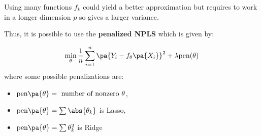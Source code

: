 Using many functions $f_k$ could yield a better approximation but requires to work in a longer dimension $p$ so gives a larger variance.

Thus, it is possible to use the \textbf{penalized NPLS} which is given by:

\begin{equation}
\min_{\theta} \frac{1}{n}\sum_{i=1}^{n}\pa{Y_i-f_\theta\pa{X_i}}^2+\lambda\mathrm{pen}(\theta)
\end{equation}
where some possible penalizations are:
\begin{itemize}
  \item $\mathrm{pen}\pa{\theta} = \text{ number of nonzero }\theta $,
  \item $\mathrm{pen}\pa{\theta} = \sum \abs{\theta_k}$ is Lasso,
  \item $\mathrm{pen}\pa{\theta} = \sum \theta_k^2$ is Ridge
\end{itemize}
